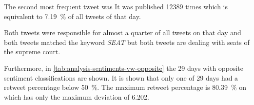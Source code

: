 \begin{enumerate}
        
        The second most frequent tweet was
        It was published \num{12389} times which is equivalent to \SI{7.19}{\percent} of all tweets of that day.

        Both tweets were responsible for almost a quarter of all tweets on that day and both tweets matched the keyword \emph{SEAT} but both tweets are dealing with seats of the supreme court. 

\end{enumerate}

Furthermore, in \cref{tab:analysis-sentiments-vw-opposite} the 29 days with opposite sentiment classifications are shown.
It is shown that only one of 29 days had a retweet percentage below \SI{50}{\percent}.
The maximum retweet percentage is \SI{80.39}{\percent} on  which has only the maximum deviation of \num{6.202}.

